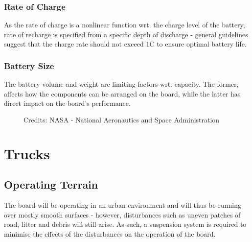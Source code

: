 \documentclass[journal,10pt]{IEEEtran}
\begin{document}
        \subsubsection{Rate of Charge}
            As the rate of charge is a nonlinear function wrt. the charge level of the battery, rate of recharge is specified from a specific depth of discharge - general guidelines suggest that the charge rate should not exceed 1C to ensure optimal battery life.
        \subsubsection{Battery Size}
        The battery volume and weight are limiting factors wrt. capacity. The former, affects how the components can be arranged on the board, while the latter has direct impact on the board's performance.    
            \begin{figure}[H]
                \centering
                \caption{Credits: NASA - National Aeronautics and Space Administration}
                \label{fig:Battery Size}
            \end{figure}
\section{Trucks}
    \subsection{Operating Terrain}
        The board will be operating in an urban environment and will thus be running over mostly smooth surfaces - however, disturbances such as uneven patches of road, litter and debris will still arise. As such, a suspension system is required to minimise the effects of the disturbances on the operation of the board.
\end{document}
